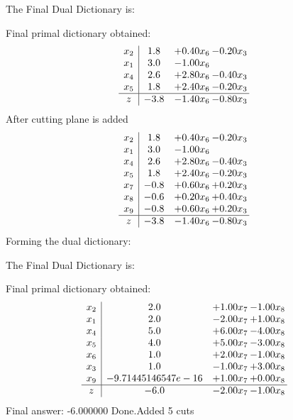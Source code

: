 \documentclass[8pt]{article}
\begin{document}
The Final Dual Dictionary is: 

 Final primal dictionary obtained: 
\[\begin{array}{c| c c@{\hskip 2pt} c@{\hskip 2pt} }
 x_{2}   &  1.8 & +  0.40 x_{6} & -0.20 x_{3}\\
 x_{1}   &  3.0 & -1.00 x_{6} &   \\
 x_{4}   &  2.6 & +  2.80 x_{6} & -0.40 x_{3}\\
 x_{5}   &  1.8 & +  2.40 x_{6} & -0.20 x_{3}\\
\hline
z    &  -3.8 & -1.40 x_{6} & -0.80 x_{3}\\
\end{array}\]
 After cutting plane is added 
\[\begin{array}{c| c c@{\hskip 2pt} c@{\hskip 2pt} }
 x_{2}   &  1.8 & +  0.40 x_{6} & -0.20 x_{3}\\
 x_{1}   &  3.0 & -1.00 x_{6} &   \\
 x_{4}   &  2.6 & +  2.80 x_{6} & -0.40 x_{3}\\
 x_{5}   &  1.8 & +  2.40 x_{6} & -0.20 x_{3}\\
 x_{7}   &  -0.8 & +  0.60 x_{6} & +  0.20 x_{3}\\
 x_{8}   &  -0.6 & +  0.20 x_{6} & +  0.40 x_{3}\\
 x_{9}   &  -0.8 & +  0.60 x_{6} & +  0.20 x_{3}\\
\hline
z    &  -3.8 & -1.40 x_{6} & -0.80 x_{3}\\
\end{array}\]
Forming the dual dictionary:

The Final Dual Dictionary is: 

 Final primal dictionary obtained: 
\[\begin{array}{c| c c@{\hskip 2pt} c@{\hskip 2pt} }
 x_{2}   &  2.0 & +  1.00 x_{7} & -1.00 x_{8}\\
 x_{1}   &  2.0 & -2.00 x_{7} & +  1.00 x_{8}\\
 x_{4}   &  5.0 & +  6.00 x_{7} & -4.00 x_{8}\\
 x_{5}   &  4.0 & +  5.00 x_{7} & -3.00 x_{8}\\
 x_{6}   &  1.0 & +  2.00 x_{7} & -1.00 x_{8}\\
 x_{3}   &  1.0 & -1.00 x_{7} & +  3.00 x_{8}\\
 x_{9}   &  -9.71445146547e-16 & +  1.00 x_{7} & +  0.00 x_{8}\\
\hline
z    &  -6.0 & -2.00 x_{7} & -1.00 x_{8}\\
\end{array}\]
 Final answer: -6.000000 
Done.Added 5 cuts 
\end{document}
